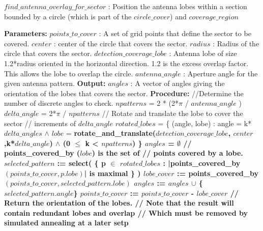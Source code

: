 \begin{algorithm}[!htb]
\caption{\textbf{$find\_antenna\_overlay\_for\_sector$} : Position the antenna lobes within a section bounded by a circle (which is part of the $circle\_cover$) and $coverage\_region$ }
\begin{algorithmic}
\State \textbf{Parameters:}
\State \tab $points\_to\_cover$ : A set of grid points that define the 
\State \tab \tab sector to be covered.
\State \tab $center$ : center of the circle that covers the sector.
\State \tab $radius$ : Radius of the circle that covers the sector.
\State \tab $detection\_coverage\_lobe$ : Antenna lobe of size 1.2*radius oriented 
\State \tab \tab in the horizontal direction. 1.2 is the excess overlap factor.
\State \tab \tab This allows the lobe to overlap the circle.  
\State \tab $antenna\_angle$ : Aperture angle for the given antenna pattern.
\State \textbf{Output:}
\State \tab  $angles$ : A vector of angles giving the orientation of the 
\State \tab \tab lobes that covers the sector.
\State \textbf{Procedure:}
\State
\State //Determine the number of discrete angles to check.
\State $npatterns$ = 2 * (2*$\pi$ / $antenna\_angle$ )
\State $delta\_angle$ = 2*$\pi$ / $npatterns$
\State // Rotate and translate the lobe to cover the sector 
\State // increments of $delta\_angle$
\State $rotated\_lobes$ = \{ (angle, lobe) :
\State \tab \tab \tab  angle = k*$delta\_angles$ 
\State \tab \tab \tab  $\wedge$ $lobe$ = \bf{rotate\_and\_translate}($detection\_coverage\_lobe$,
\State \tab \tab \tab \tab \tab $center$,k*$delta\_angle$) 
\State \tab \tab  \tab $\wedge$ (0 $\le$ k < $npatterns$) \}
\State
\State $angles$ = $\emptyset$
\State // \bf{points\_covered\_by} ($lobe$) is the set of 
\State // points covered by a lobe.
\State $selected\_pattern$ := \bf{select}( \{ p $\in$ $rotated\_lobes$ : 
\State \tab \tab \tab |\bf{points\_covered\_by}$(points\_to\_cover,p.lobe)$| 
\State \tab \tab \tab \tab is maximal \} )
\State $lobe\_cover$ := \bf{points\_covered\_by}$(points\_to\_cover,selected\_pattern.lobe)$
\State $angles$ := $angles$  $\cup$ \{$selected\_pattern.angle$\}
\State $points\_to\_cover$ := $points\_to\_cover$ - $lobe\_cover$
\EndWhile
\State // Return the orientation of the lobes.
\State // Note that the result will contain redundant lobes and overlap 
\State // Which must be removed by simulated annealing at a later setp
\State {}
\end{algorithmic}
\end{algorithm}


